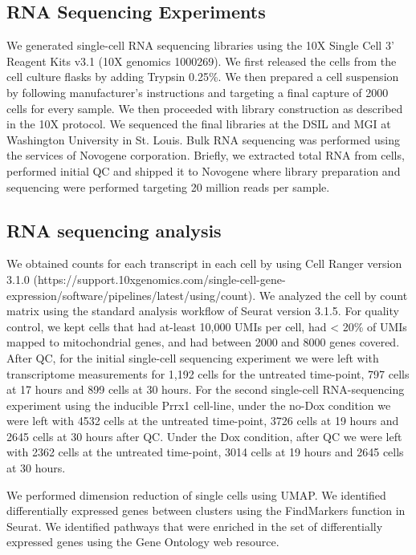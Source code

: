\subsection{RNA Sequencing Experiments}
We generated single-cell RNA sequencing libraries using the 10X Single Cell 3’ Reagent Kits v3.1 (10X genomics 1000269). We first released the cells from the cell culture flasks by adding Trypsin 0.25\%. We then prepared a cell suspension by following manufacturer’s instructions and targeting a final capture of 2000 cells for every sample. We then proceeded with library construction as described in the 10X protocol. We sequenced the final libraries at the DSIL and MGI at Washington University in St. Louis. Bulk RNA sequencing was performed using the services of Novogene corporation. Briefly, we extracted total RNA from cells, performed initial QC and shipped it to Novogene where library preparation and sequencing were performed targeting 20 million reads per sample. 

\subsection{RNA sequencing analysis}
We obtained counts for each transcript in each cell by using Cell Ranger version 3.1.0 (https://support.10xgenomics.com/single-cell-gene-expression/software/pipelines/latest/using/count).  We analyzed the cell by count matrix using the standard analysis workflow of Seurat version 3.1.5.\cite{Butler2018-jc,Stuart2019-ra} For quality control, we kept cells that had at-least 10,000 UMIs per cell, had < 20\% of UMIs mapped to mitochondrial genes, and had between 2000 and 8000 genes covered. After QC, for the initial single-cell sequencing experiment we were left with transcriptome measurements for 1,192 cells for the untreated time-point, 797 cells at 17 hours and 899 cells at 30 hours. For the second single-cell RNA-sequencing experiment using the inducible Prrx1 cell-line, under the no-Dox condition we were left with 4532 cells at the untreated time-point, 3726 cells at 19 hours and 2645 cells at 30 hours after QC. Under the Dox condition, after QC we were left with 2362 cells at the untreated time-point, 3014 cells at 19 hours and 2645 cells at 30 hours. 

We performed dimension reduction of single cells using UMAP\cite{McInnes2018-sm}. We identified differentially expressed genes between clusters using the FindMarkers function in Seurat.  We identified pathways that were enriched in the set of differentially expressed genes using the Gene Ontology web resource\cite{Ashburner2000-id,Mi2019-pi,Gene_Ontology_Consortium2021-mx}.

